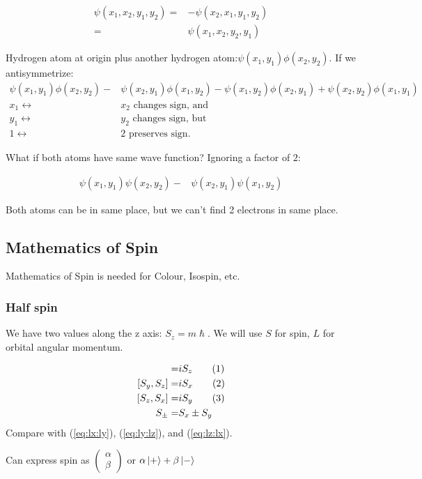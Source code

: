 \documentclass[]{article}
\newcommand\numberthis{\addtocounter{equation}{1}\tag{\theequation}}
\begin{document}
\begin{align*}
\psi(x_1,x_2,y_1,y_2) = &-\psi(x_2,x_1,y_1,y_2)\\
=& \psi(x_1,x_2,y_2,y_1)
\end{align*} 

Hydrogen atom at origin plus another hydrogen atom:$\psi(x_1,y_1) \phi(x_2,y_2)$.
If we antisymmetrize:
\begin{align*}
	\psi(x_1,y_1) \phi(x_2,y_2) -& \psi(x_2,y_1) \phi(x_1,y_2) 
	-\psi(x_1,y_2) \phi(x_2,y_1) + \psi(x_2,y_2) \phi(x_1,y_1)\\
	x_1 \leftrightarrow& x_2 \text{ changes sign, and}\\
	y_1 \leftrightarrow& y_2 \text{ changes sign, but}\\
	1 \leftrightarrow& 2 \text { preserves sign.}
\end{align*}

What if both atoms have same wave function? Ignoring a factor of $2$:

\begin{align*}
	\psi(x_1,y_1) \psi(x_2,y_2) -& \psi(x_2,y_1) \psi(x_1,y_2) 
\end{align*}

Both atoms can be in same place, but we can't find 2 electrons in same place.

\subsection{Mathematics of Spin}

Mathematics of Spin is needed for Colour, Isospin, etc.

\subsubsection{Half spin}

We have two values along the z axis: $S_z = m \hslash$. We will use $S$ for spin, $L$ for orbital angular momentum.

\begin{align*}
	[S_x,S_y] =& i S_z \numberthis \label{eq:sx:sy}\\
	[S_y,S_z] =& i S_x  \numberthis \label{eq:sy:sz}\\
	[S_z,S_x] =& i S_y  \numberthis \label{eq:sz:sx}\\
	S_\pm =& S_x \pm S_y
\end{align*}
Compare with (\ref{eq:lx:ly}),  (\ref{eq:ly:lz}), and  (\ref{eq:lz:lx}).

Can express spin as $\begin{pmatrix}
\alpha\\
\beta
\end{pmatrix}$ or $\alpha\ket{+} + \beta\ket{-}$ 
\end{document}
